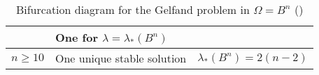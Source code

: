 \begin{table}[ht!]
\begin{tabular}{c|p{}|c}
                                           & One for $\lambda = \lambda_\ast(B^n)$                                   &                                             \\ \midrule
        $n\geq 10$                         & One unique stable solution                                              & $\lambda_\ast(B^n)=2(n-2)$                  \\ \midrule
    \end{tabular}
    \caption{Bifurcation diagram for the Gelfand problem in $\Omega = B^n$ (\cite{stable-solutions-elliptic})}
\end{table}
